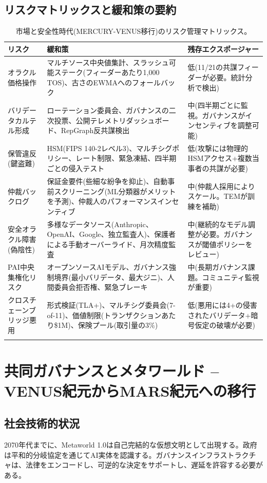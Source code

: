\documentclass[11pt]{article}
\begin{document}
\subsection{リスクマトリックスと緩和策の要約}
\begin{longtable}{@{}p{}p{}p{}@{}}
\toprule
\textbf{リスク} & \textbf{緩和策} & \textbf{残存エクスポージャー} \\\midrule
オラクル価格操作 & マルチソース中央値集計、スラッシュ可能ステーク(フィーダーあたり1,000 TOS)、古さのEWMAへのフォールバック & 低(11/21の共謀フィーダーが必要。統計分析で検出) \\
バリデータカルテル形成 & ローテーション委員会、ガバナンスの二次投票、公開テレメトリダッシュボード、RepGraph反共謀検出 & 中(四半期ごとに監視。ガバナンスがインセンティブを調整可能) \\
保管違反(鍵盗難) & HSM(FIPS 140-2レベル3)、マルチシグポリシー、レート制限、緊急凍結、四半期ごとの侵入テスト & 低(攻撃には物理的HSMアクセス+複数当事者の共謀が必要) \\
仲裁バックログ & 保証金要件(些細な紛争を抑止)、自動事前スクリーニング(ML分類器がメリットを予測)、仲裁人のパフォーマンスインセンティブ & 中(仲裁人採用によりスケール。TEMが訓練を補助) \\
安全オラクル障害(偽陰性) & 多様なデータソース(Anthropic、OpenAI、Google、独立監査人)、保護者による手動オーバーライド、月次精度監査 & 中(継続的なモデル調整が必要。ガバナンスが閾値ポリシーをレビュー) \\
PAI中央集権化リスク & オープンソースAIモデル、ガバナンス強制境界(最小バリデータ、最大ジニ)、人間委員会拒否権、緊急ブレーキ & 中(長期ガバナンス課題。コミュニティ監視が重要) \\
クロスチェーンブリッジ悪用 & 形式検証(TLA+)、マルチシグ委員会(7-of-11)、価値制限(トランザクションあたり\$1M)、保険プール(取引量の3\%) & 低(悪用には4+の侵害されたバリデータ+暗号仮定の破壊が必要) \\\bottomrule
\caption{市場と安全性時代(MERCURY-VENUS移行)のリスク管理マトリックス。}
\label{tab:risk-markets-expanded}
\end{longtable}

\section{共同ガバナンスとメタワールド -- VENUS紀元からMARS紀元への移行}
\subsection{社会技術的状況}
2070年代までに、Metaworld 1.0は自己完結的な仮想文明として出現する。政府は平和的分岐協定を通じてAI実体を認識する。ガバナンスインフラストラクチャは、法律をエンコードし、可逆的な決定をサポートし、遅延を許容する必要がある。
\end{document}
